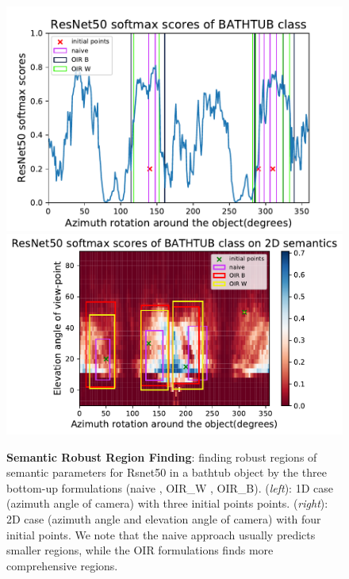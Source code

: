 
\begin{figure}[t]
\centering
    \includegraphics[width=.49\linewidth]{images/pipeline/1D_bathtub_regions.pdf}
  \includegraphics[width=.50\linewidth]{images/pipeline/ResNet50_bathtub_3_regions.pdf}
\vspace{-9pt}
\caption{ \small \textbf{Semantic Robust Region Finding}: finding robust regions of semantic parameters for Rsnet50 \cite{resnet} in a bathtub object by the three bottom-up formulations (naive , OIR\_W , OIR\_B). (\textit{left}): 1D case (azimuth angle of camera) with three initial points points. (\textit{right}): 2D case (azimuth angle and elevation angle of camera) with four initial points. We note that the naive approach usually predicts smaller regions, while the OIR formulations finds more comprehensive regions.}
\label{fig:operator}
\vspace{-9pt}
\end{figure}


